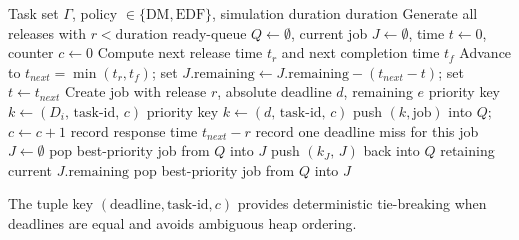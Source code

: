 \documentclass[12pt,a4paper]{article}
\begin{document}
\begin{algorithm}[H]
\caption{Unified event-driven simulation core (DM/EDF)}
\label{alg:event_core}
\begin{algorithmic}[1]
\Require Task set \(\Gamma\), policy \(\in \{\text{DM},\text{EDF}\}\), simulation duration \(\text{duration}\)
\State Generate all releases with \(r < \text{duration}\)
\State ready-queue \(Q \gets \emptyset\), current job \(J \gets \emptyset\), time \(t \gets 0\), counter \(c \gets 0\)
    \State Compute next release time \(t_r\) and next completion time \(t_f\)
    \State Advance to \(t_{next}=\min(t_r,t_f)\); set \(J.\text{remaining} \gets J.\text{remaining} - (t_{next} - t)\); set \(t \gets t_{next}\)
        \State Create job with release \(r\), absolute deadline \(d\), remaining \(e\)
            \State priority key \(k \gets (D_i,\, \text{task-id},\, c)\)
        \Else
            \State priority key \(k \gets (d,\, \text{task-id},\, c)\)
        \EndIf
        \State push \((k,\text{job})\) into \(Q\); \(c \gets c+1\)
    \EndWhile
        \State record response time \(t_{next}-r\)
         record one deadline miss for this job \EndIf
        \State \(J \gets \emptyset\)
    \EndIf
         pop best-priority job from \(Q\) into \(J\)
            \State {}
            \State push \((k_J,\, J)\) back into \(Q\) retaining current \(J.\text{remaining}\)
            \State pop best-priority job from \(Q\) into \(J\)
        \EndIf
    \EndIf
\EndWhile
\end{algorithmic}
\end{algorithm}

The tuple key \((\text{deadline}, \text{task-id}, c)\) provides deterministic tie-breaking when deadlines are equal and avoids ambiguous heap ordering.
\end{document}
